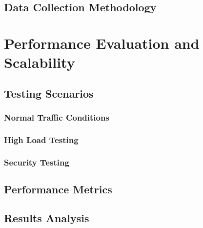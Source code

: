 \subsection{Data Collection Methodology}
\label{subsec:data-collection}

\section{Performance Evaluation and Scalability}
\label{sec:performance}

\subsection{Testing Scenarios}
\label{subsec:testing-scenarios}

\subsubsection{Normal Traffic Conditions}

\subsubsection{High Load Testing}

\subsubsection{Security Testing}

\subsection{Performance Metrics}
\label{subsec:metrics}

\subsection{Results Analysis}
\label{subsec:results}

